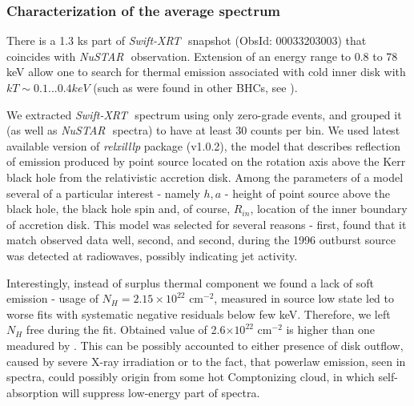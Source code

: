 \documentclass[a4paper,fleqn,usenatbib]{mnras}
\def\swiftx{{\em Swift-XRT\,}}
\def\nustar{{\em NuSTAR\,}}
\begin{document}
\subsubsection{Characterization of the average spectrum}            
There is a 1.3 ks part of \swiftx\, snapshot (ObsId: 00033203003) that coincides with \nustar\, observation. Extension of an energy range to 0.8 to 78 keV allow one to search for thermal emission associated with cold inner disk with $kT \sim 0.1...0.4 keV$ (such as were found in other BHCs, see \cite[][ e.t.c]{miller06b,miller06a,parker15}).

We extracted \swiftx\, spectrum using only zero-grade events, and grouped it (as well as \nustar\, spectra) to have at least 30 counts per bin. We used latest available version of {\it relxilllp} package (v1.0.2), the model that describes reflection of emission produced by point source located on the rotation axis above the Kerr black hole from the relativistic accretion disk. Among the parameters of a model several of a particular interest - namely $h,a$ - height of point source above the black hole, the black hole spin and, of course, $R_{in}$, location of the inner boundary of accretion disk.  This model was selected for several reasons - first, \cite{miller15_nust} found that it match observed data well, second, and second, during the 1996 outburst source was detected at radiowaves, possibly indicating jet activity.

Interestingly, instead of surplus thermal component we found a lack of soft emission - usage of $N_{H} = 2.15\times10^{22}$ cm$^{-2}$, measured in source low state \citep{furst16} led to worse fits with systematic negative residuals below few keV. Therefore, we left $N_{H}$ free during the fit. Obtained value of 2.6$\times10^{22}$ cm$^{-2}$ is higher than one meadured by \cite{furst16}. This can be possibly accounted to either presence of disk outflow, caused by severe X-ray irradiation or to the fact, that powerlaw emission, seen in spectra, could possibly origin from some hot Comptonizing cloud, in which self-absorption will suppress low-energy part of spectra. 
\end{document}
